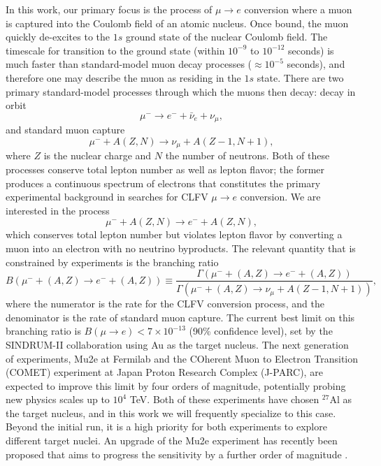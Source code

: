 \documentclass[12pt,letterpaper]{book}
\begin{document}
In this work, our primary focus is the process of $\mu\rightarrow e$ conversion where a muon is captured into the Coulomb field of an atomic nucleus. 
Once bound, the muon quickly de-excites to the $1s$ ground state of the nuclear Coulomb field. The timescale for transition to the ground state (within $10^{-9}$ to $10^{-12}$ seconds) is much faster than standard-model muon decay processes ($\approx 10^{-5}$ seconds), and therefore one may describe the muon as residing in the $1s$ state. There are two primary standard-model processes through which the muons then decay: decay in orbit
\begin{equation}
\mu^-\rightarrow e^- + \bar{\nu}_e+\nu_{\mu},
\end{equation}
and standard muon capture
\begin{equation}
\mu^- + A(Z,N)\rightarrow \nu_{\mu}+A(Z-1,N+1),
\end{equation}
where $Z$ is the nuclear charge and $N$ the number of neutrons. Both of these processes conserve total lepton number as well as lepton flavor; the former produces a continuous spectrum of electrons that constitutes the primary experimental background in searches for CLFV $\mu\rightarrow e$ conversion. We are interested in the process
\begin{equation}
\mu^-+A(Z,N)\rightarrow e^- + A(Z,N),
\end{equation}
which conserves total lepton number but violates lepton flavor  by converting a muon into an electron with no neutrino byproducts. The relevant quantity that is constrained by experiments is the branching ratio
\begin{equation}
B(\mu^-+(A,Z)\rightarrow e^- + (A,Z))\equiv\frac{\Gamma(\mu^-+(A,Z)\rightarrow e^-+(A,Z))}{\Gamma(\mu^-+(A,Z)\rightarrow\nu_{\mu}+A(Z-1,N+1))},
\end{equation}
where the numerator is the rate for the CLFV conversion process, and the denominator is the rate of standard muon capture. The current best limit on this branching ratio is $B(\mu\rightarrow e)<7\times 10^{-13}$ (90\% confidence level), set by the SINDRUM-II collaboration \cite{Bertl2006} using Au as the target nucleus. The next generation of experiments, Mu2e at Fermilab \cite{Bernstein_2019} and the COherent Muon to Electron Transition (COMET) experiment \cite{10.3389/fphy.2018.00133} at Japan Proton Research Complex (J-PARC), are expected to improve this limit by four orders of magnitude, potentially probing new physics scales up to $10^4$ TeV. Both of these experiments have chosen $^{27}$Al as the target nucleus, and in this work we will frequently specialize to this case. Beyond the initial run, it is a high priority for both experiments to explore different target nuclei. An upgrade of the Mu2e experiment has recently been proposed that aims to progress the sensitivity by a further order of magnitude \cite{Mu2e:2018osu}.
\end{document}
